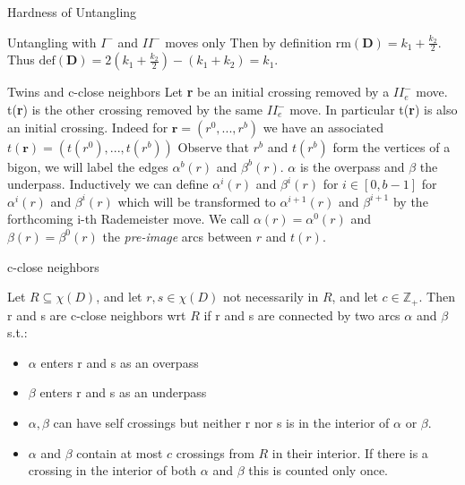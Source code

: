 \documentclass{beamer}
\begin{document}
\begin{section}{Hardness of Untangling}
\begin{frame}{Untangling with $I^-$ and $II^-$ moves only}
    Then by definition $\text{rm}(\mathbf{D})=k_1+\frac{k_2}{2}$. 
    Thus $\text{def}(\mathbf{D})=2(k_1+\frac{k_2}{2})-(k_1+k_2)=k_1$. 
    
    \end{frame}{}
    
    \begin{frame}{Twins and c-close neighbors}
        Let \textbf{r} be an initial crossing removed by a $II^-_e$ move. t(\textbf{r}) is the other crossing removed by the same $II^-_e$ move. 
        \newline
        \newline
        In particular t(\textbf{r}) is also an initial crossing. Indeed for $\mathbf{r}=(r^0,...,r^b)$ we have an associated $t(\mathbf{r})=(t(r^0),...,t(r^b))$
        \newline
        \newline
        Observe that $r^b$ and $t(r^b)$ form the vertices of a bigon, we will label the edges $\alpha^b(r)$ and $\beta^b(r)$. $\alpha$ is the overpass and $\beta$ the underpass. Inductively we can define $\alpha^i(r)$ and $\beta^i(r)$ for $i\in [0,b-1]$ for $\alpha^i(r)$ and $\beta^i(r)$ which will be transformed to $\alpha^{i+1}(r)$ and $\beta^{i+1}$ by the forthcoming i-th Rademeister move. 
        \newline
        \newline
        We call $\alpha(r)=\alpha^0(r)$ and $\beta(r)=\beta^0(r)$ the \textit{pre-image} arcs between $r$ and $t(r)$. 
    \end{frame}
    
    \begin{frame}{c-close neighbors}
    
        Let $R\subseteq \chi(D)$, and let $r,s \in \chi(D)$ not necessarily in $R$, and let $c\in \mathbb{Z}_+$. Then r and s are c-close neighbors wrt $R$ if r and s are connected by two arcs $\alpha$ and $\beta$ s.t.:
        \begin{itemize}
            \item $\alpha$ enters r and s as an overpass
            \item $\beta$ enters r and s as an underpass
            \item $\alpha, \beta$ can have self crossings but neither r nor s is in the interior of $\alpha$ or $\beta$.
            \item $\alpha$ and $\beta$ contain at most $c$ crossings from $R$ in their interior. If there is a crossing in the interior of both $\alpha$ and $\beta$ this is counted only once. 
        \end{itemize}{}
        

\end{frame}
\end{section}
\end{document}
